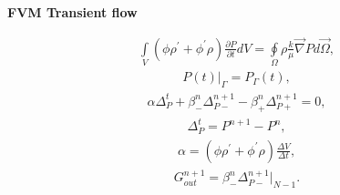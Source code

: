 \documentclass[a4paper,12pt]{extreport}
\begin{document}
\begin{multicols}{2}
        \columnbreak
        \begin{center}
        {\large \textbf{FVM Transient flow}}
        \end{center}
        \begin{eqnarray}
            \label{eq:conductivity_integral}
            \int \limits_{V} \left( \phi \rho^\prime + \phi^\prime \rho \right) \frac{\partial P}{\partial t} d V = \oint \limits_{\Omega} \rho \frac{k}{\mu} \vec{\nabla}P d\vec{\Omega},
        \end{eqnarray}
        \begin{eqnarray}
            \label{eq:conductivity_bound}
            P\left(t\right) \Big|_\Gamma = P_\Gamma\left(t\right),
        \end{eqnarray}
        \begin{eqnarray}
            \label{eq:conductivity_num}
            \alpha \Delta^{t}_{P} + \beta^n_{-}\Delta^{n+1}_{P-} - \beta^n_{+}\Delta^{n+1}_{P+}= 0,
        \end{eqnarray}
        \begin{eqnarray}
            \label{eq:delta_P_t_num}
            \Delta^{t}_{P} = P^{n+1} - P^{n},
        \end{eqnarray}
        \begin{eqnarray}
            \label{eq:alpha}
            \alpha = \left( \phi \rho^\prime + \phi^\prime \rho \right) \frac{\Delta V}{\Delta t},
        \end{eqnarray}
        \begin{eqnarray}
            \label{eq:Consumption_conductivity_integral}
            G_{out}^{n+1} = \beta^n_-\Delta^{n+1}_{P-} \Big|_ {N-1}.                        
        \end{eqnarray}
    \end{multicols}

    \vspace{1.cm}
\end{document}
